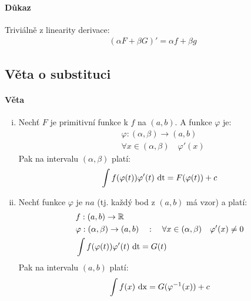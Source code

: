 \documentclass[a4paper,10pt]{article}
\begin{document}
\paragraph{Důkaz}
Triviálně z linearity derivace:
\begin{align}
	(\alpha F + \beta G)' = \alpha f + \beta g
\end{align}


\subsection{Věta o substituci}
\setcounter{equation}{0}
\paragraph{Věta}
\begin{enumerate}[i.]
	\item Nechť $F$ je primitivní funkce k $f$ na $(a,b)$. A funkce $\varphi$ je:
        \begin{align*}
            &\varphi: (\alpha, \beta) \to (a,b) \\
            &\forall x \in (\alpha, \beta) \quad \varphi'(x)
        \end{align*}
        Pak na  intervalu $(\alpha, \beta)$ platí:
        \begin{align*}
        	\int f(\varphi(t)) \varphi'(t) \operatorname*{\,dt} = F( \varphi(t)) + c
        \end{align*}
    \item Nechť funkce $\varphi$ je $na$ (tj. každý bod z $(a,b)$ má vzor) a platí:
        \begin{align*}
            &f: (a,b) \to \mathbb{R} \\
            &\varphi: (\alpha, \beta) \to (a, b)
        	\quad : \quad \forall x \in (\alpha, \beta) \quad \varphi'(x) \neq 0 \\
            &\int f(\varphi(t)) \varphi'(t) \operatorname*{\,dt} = G(t)
        \end{align*}
        Pak na intervalu $(a, b)$ platí:
        \begin{align*}
            \int f(x) \operatorname*{\,dx} = G(\varphi^{-1}(x)) + c 
        \end{align*}
\end{enumerate}
\end{document}
